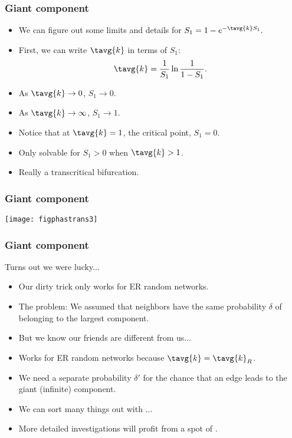 \begin{frame}[label=]
  \frametitle{Giant component}
  
  \begin{itemize}
  \item<1-> 
    We can figure out some limits and details for 
    $
    S_1 = 1 - e^{-\tavg{k}S_1}.
    $
  \item<2-> 
    First, we can write $\tavg{k}$ in terms of $S_1$:
    $$
    \tavg{k} = \frac{1}{S_1}\ln{\frac{1}{1-S_1}}.
    $$
  \item<3->
    As $\tavg{k} \rightarrow 0$, $S_1 \rightarrow 0$.
  \item<4->
    As $\tavg{k} \rightarrow \infty$, $S_1 \rightarrow 1$.
  \item<5->
    Notice that at $\tavg{k}=1$, the critical point, $S_1=0$.
  \item<6->
    Only solvable for $S_1>0$ when $\tavg{k}>1$.
  \item<7->
    Really a transcritical bifurcation.\cite{strogatz1994a}
  \end{itemize}

\end{frame}

\begin{frame}[label=]
  \frametitle{Giant component}

  \texttt{[image: figphastrans3]}

\end{frame}

\begin{frame}[label=]
  \frametitle{Giant component}

  \begin{block}{Turns out we were lucky...}
    \begin{itemize}
    \item<1-> 
      Our dirty trick \alert{only works for} ER random networks.
    \item<2-> 
      \alert{The problem:} We assumed that neighbors have the same
      probability $\delta$ of belonging to the
      largest component.
    \item<3-> 
      But we know our friends are different from us...
    \item<4->
      Works for ER random networks because $\tavg{k} = \tavg{k}_R$.
    \item<5->
      We need a separate probability $\delta'$ for
      the chance that an edge \alert{leads to}
      the giant (infinite) component.
    \item<6->
      We can sort many things out with ...
    \item<7>
      More detailed investigations will profit from
      a spot of .\cite{wilf2006a}
    \end{itemize}
  \end{block}

\end{frame}

